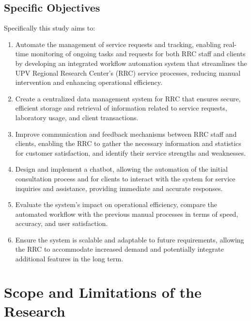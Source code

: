 \subsection{Specific Objectives}
\label{sec:specificobjectives}

Specifically this study aims to:

\begin{enumerate}
   \item Automate the management of service requests and tracking, enabling real-time monitoring of ongoing tasks and requests for both RRC staff and clients by developing an integrated workflow automation system that streamlines the UPV Regional Research Center's (RRC) service processes, reducing manual intervention and enhancing operational efficiency.
   
   \item Create a centralized data management system for RRC that ensures secure, efficient storage and retrieval of information related to service requests, laboratory usage, and client transactions.
   
   \item Improve communication and feedback mechanisms between RRC staff and clients, enabling the RRC to gather the necessary information and statistics for customer satisfaction, and identify their service strengths and weaknesses.
   
   \item Design and implement a chatbot, allowing the automation of the initial consultation process and for clients to interact with the system for service inquiries and assistance, providing immediate and accurate responses.
   
   \item Evaluate the system’s impact on operational efficiency, compare the automated workflow with the previous manual processes in terms of speed, accuracy, and user satisfaction.
   
   \item Ensure the system is scalable and adaptable to future requirements, allowing the RRC to accommodate increased demand and potentially integrate additional features in the long term.
   
\end{enumerate}


\section{Scope and Limitations of the Research}
\label{sec:scopelimitations}

